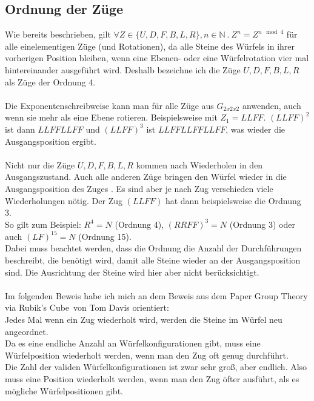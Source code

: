 \documentclass[12pt,a4paper, usenames, dvipsnames]{article}
\begin{document}
\subsection*{Ordnung der Züge}
Wie bereits beschrieben, gilt $\forall Z \in \{ U, D, F, B, L, R \}, n \in \mathbb{N} \ . \ Z^n=Z^{n \mod 4}$ für alle einelementigen Züge (und Rotationen), da alle Steine des Würfels in ihrer vorherigen Position bleiben, wenn eine Ebenen- oder eine Würfelrotation vier mal hintereinander ausgeführt wird. Deshalb bezeichne ich die Züge $U, D, F, B, L, R$ als Züge der Ordnung 4. \\
\\
Die Exponentenschreibweise kann man für alle Züge aus $G_{2x2x2}$ anwenden, auch wenn sie mehr als eine Ebene rotieren. Beispielsweise mit $Z_1=LLFF$. $(LLFF)^2$ ist dann $LLFFLLFF$ und $(LLFF)^3$ ist $LLFFLLFFLLFF$, was wieder die Ausgangsposition ergibt. \\
\\
Nicht nur die Züge $U, D, F, B, L, R$ kommen nach Wiederholen in den Ausgangszustand. Auch alle anderen Züge bringen den Würfel wieder in die Ausgangsposition des Zuges \cite{TD}. Es sind aber je nach Zug verschieden viele Wiederholungen nötig. Der Zug $(LLFF)$ hat dann beispielsweise die Ordnung 3. \\
So gilt zum Beispiel: ${R^4= N}$ (Ordnung 4), ${(RRFF)^3 = N}$ (Ordnung 3) oder auch ${(LF)^{15}=N}$ (Ordnung 15).\\ Dabei muss beachtet werden, dass die Ordnung die Anzahl der Durchführungen beschreibt, die benötigt wird, damit alle Steine wieder an der Ausgangsposition sind. Die Ausrichtung der Steine wird hier aber nicht berücksichtigt. \\
\\
Im folgenden Beweis habe ich mich an dem Beweis aus dem Paper \glqq Group Theory via Rubik's Cube\grqq \ von Tom Davis \cite{TD} orientiert: \\
Jedes Mal wenn ein Zug wiederholt wird, werden die Steine im Würfel neu angeordnet. \\ 
Da es eine endliche Anzahl an Würfelkonfigurationen gibt, muss eine Würfelposition wiederholt werden, wenn man den Zug oft genug durchführt. \\
Die Zahl der validen Würfelkonfigurationen ist zwar sehr groß, aber endlich. Also muss eine Position wiederholt werden, wenn man den Zug öfter ausführt, als es mögliche Würfelpositionen gibt. \\
\end{document}
